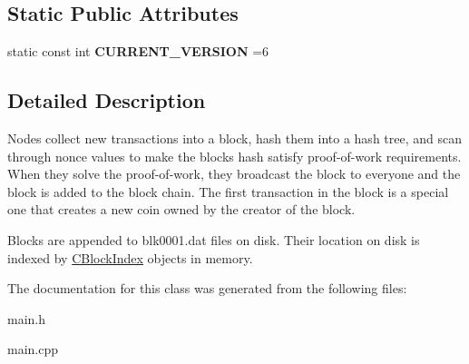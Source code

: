 \subsection*{Static Public Attributes}
\begin{DoxyCompactItemize}
\item 
\mbox{\label{class_c_block_a176c687e9b513ebad07954f2be8b0f6d}} 
static const int {\bfseries C\+U\+R\+R\+E\+N\+T\+\_\+\+V\+E\+R\+S\+I\+ON} =6
\end{DoxyCompactItemize}


\subsection{Detailed Description}
Nodes collect new transactions into a block, hash them into a hash tree, and scan through nonce values to make the block\textquotesingle{}s hash satisfy proof-\/of-\/work requirements. When they solve the proof-\/of-\/work, they broadcast the block to everyone and the block is added to the block chain. The first transaction in the block is a special one that creates a new coin owned by the creator of the block.

Blocks are appended to blk0001.\+dat files on disk. Their location on disk is indexed by \mbox{\hyperlink{class_c_block_index}{C\+Block\+Index}} objects in memory. 

The documentation for this class was generated from the following files\+:\begin{DoxyCompactItemize}
\item 
main.\+h\item 
main.\+cpp\end{DoxyCompactItemize}
